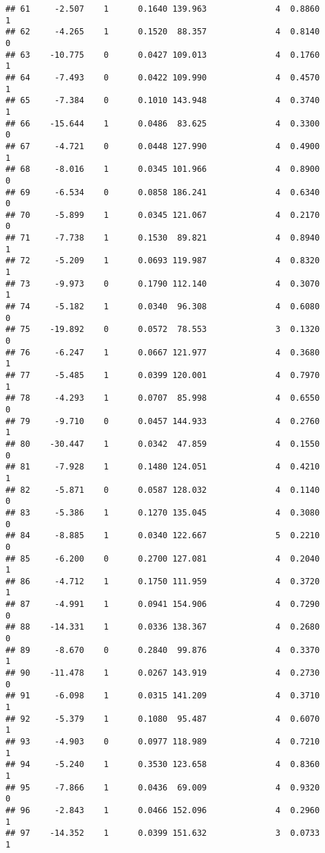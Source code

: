 \documentclass[
]{article}
\begin{document}
\begin{verbatim}
## 61     -2.507    1      0.1640 139.963              4  0.8860      1
## 62     -4.265    1      0.1520  88.357              4  0.8140      0
## 63    -10.775    0      0.0427 109.013              4  0.1760      1
## 64     -7.493    0      0.0422 109.990              4  0.4570      1
## 65     -7.384    0      0.1010 143.948              4  0.3740      1
## 66    -15.644    1      0.0486  83.625              4  0.3300      0
## 67     -4.721    0      0.0448 127.990              4  0.4900      1
## 68     -8.016    1      0.0345 101.966              4  0.8900      0
## 69     -6.534    0      0.0858 186.241              4  0.6340      0
## 70     -5.899    1      0.0345 121.067              4  0.2170      0
## 71     -7.738    1      0.1530  89.821              4  0.8940      1
## 72     -5.209    1      0.0693 119.987              4  0.8320      1
## 73     -9.973    0      0.1790 112.140              4  0.3070      1
## 74     -5.182    1      0.0340  96.308              4  0.6080      0
## 75    -19.892    0      0.0572  78.553              3  0.1320      0
## 76     -6.247    1      0.0667 121.977              4  0.3680      1
## 77     -5.485    1      0.0399 120.001              4  0.7970      1
## 78     -4.293    1      0.0707  85.998              4  0.6550      0
## 79     -9.710    0      0.0457 144.933              4  0.2760      1
## 80    -30.447    1      0.0342  47.859              4  0.1550      0
## 81     -7.928    1      0.1480 124.051              4  0.4210      1
## 82     -5.871    0      0.0587 128.032              4  0.1140      0
## 83     -5.386    1      0.1270 135.045              4  0.3080      0
## 84     -8.885    1      0.0340 122.667              5  0.2210      0
## 85     -6.200    0      0.2700 127.081              4  0.2040      1
## 86     -4.712    1      0.1750 111.959              4  0.3720      1
## 87     -4.991    1      0.0941 154.906              4  0.7290      0
## 88    -14.331    1      0.0336 138.367              4  0.2680      0
## 89     -8.670    0      0.2840  99.876              4  0.3370      1
## 90    -11.478    1      0.0267 143.919              4  0.2730      0
## 91     -6.098    1      0.0315 141.209              4  0.3710      1
## 92     -5.379    1      0.1080  95.487              4  0.6070      1
## 93     -4.903    0      0.0977 118.989              4  0.7210      1
## 94     -5.240    1      0.3530 123.658              4  0.8360      1
## 95     -7.866    1      0.0436  69.009              4  0.9320      0
## 96     -2.843    1      0.0466 152.096              4  0.2960      1
## 97    -14.352    1      0.0399 151.632              3  0.0733      1

\end{verbatim}
\end{document}
